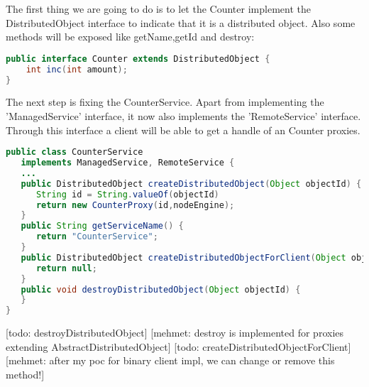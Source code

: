 The first thing we are going to do is to let the Counter implement the DistributedObject interface to indicate that it is a distributed object. Also some methods will be exposed like getName,getId and destroy:
\begin{lstlisting}[language=java]
public interface Counter extends DistributedObject {
    int inc(int amount);
}
\end{lstlisting}

The next step is fixing the CounterService. Apart from implementing the 'ManagedService' interface, it now also implements the 'RemoteService' interface. Through this interface a client will be able to get a handle of an Counter proxies. 
\begin{lstlisting}[language=java]
public class CounterService 
   implements ManagedService, RemoteService {
   ...  
   public DistributedObject createDistributedObject(Object objectId) {
      String id = String.valueOf(objectId)
      return new CounterProxy(id,nodeEngine);
   }
   public String getServiceName() {
      return "CounterService";
   }
   public DistributedObject createDistributedObjectForClient(Object objectId) {
      return null;
   }
   public void destroyDistributedObject(Object objectId) {
   }
}
\end{lstlisting}
[todo: destroyDistributedObject] [mehmet: destroy is implemented for proxies extending AbstractDistributedObject]
[todo: createDistributedObjectForClient] [mehmet: after my poc for binary client impl, we can change or remove this method!]


